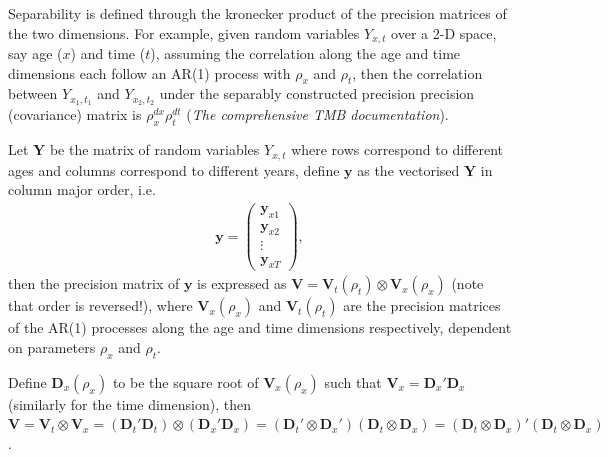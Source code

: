 \documentclass[12pt,a4paper]{article}
\begin{document}
Separability is defined through the kronecker product of the precision matrices of the two dimensions. For example, given random variables $Y_{x,t}$ over a 2-D space, say age ($x$) and time ($t$), assuming the correlation along the age and time dimensions each follow an AR(1) process with $\rho_x$ and $\rho_t$, then the correlation between $Y_{x_1, t_1}$ and $Y_{x_2, t_2}$ under the separably constructed precision precision (covariance) matrix is $\rho_x^{dx} \rho_t^{dt}$ (\textit{The comprehensive TMB documentation}). 

Let $\boldsymbol{Y}$ be the matrix of random variables $Y_{x,t}$ where rows correspond to different ages and columns correspond to different years, define $\boldsymbol{y}$ as the vectorised $\boldsymbol{Y}$ in column major order, i.e. 
\begin{align*}
\boldsymbol{y} = \begin{pmatrix} \boldsymbol{y}_{x1} \\ \boldsymbol{y}_{x2} \\ \vdots \\ \boldsymbol{y}_{xT} \end{pmatrix},
\end{align*}
 then the precision matrix of $\boldsymbol{y}$ is expressed as $\boldsymbol{V} = \boldsymbol{V}_t(\rho_t) \otimes \boldsymbol{V}_x(\rho_x)$ (note that order is reversed!), where $\boldsymbol{V}_x(\rho_x)$ and $\boldsymbol{V}_t(\rho_t)$ are the precision matrices of the AR(1) processes along the age and time dimensions respectively, dependent on parameters $\rho_x$ and $\rho_t$.

Define $\boldsymbol{D}_x(\rho_x)$ to be the square root of $\boldsymbol{V}_x(\rho_x)$ such that $\boldsymbol{V}_x = \boldsymbol{D}_x'\boldsymbol{D}_x$ (similarly for the time dimension), then $\boldsymbol{V} = \boldsymbol{V}_t \otimes \boldsymbol{V}_x = (\boldsymbol{D}_t'\boldsymbol{D}_t) \otimes (\boldsymbol{D}_x'\boldsymbol{D}_x) = (\boldsymbol{D}_t' \otimes \boldsymbol{D}_x')(\boldsymbol{D}_t \otimes \boldsymbol{D}_x) = (\boldsymbol{D}_t \otimes \boldsymbol{D}_x)' (\boldsymbol{D}_t \otimes \boldsymbol{D}_x)$.
\end{document}
